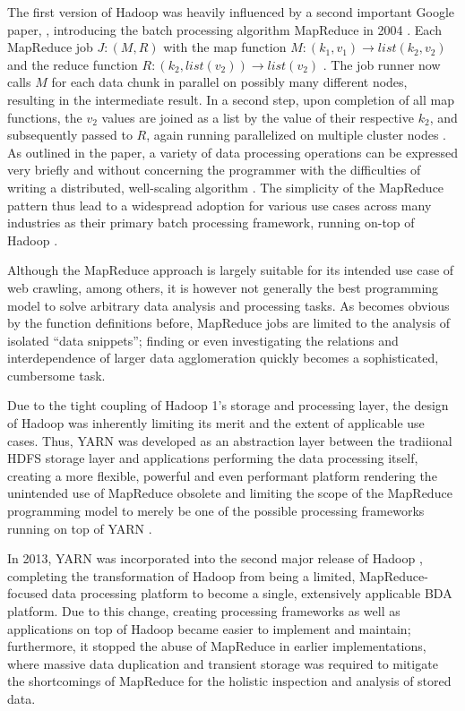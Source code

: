 The first version of Hadoop was heavily influenced by a second important Google paper, \textcite[p.~82]{rajasekar2015survey}, introducing the batch processing algorithm MapReduce in 2004 \autocite{dean2004mapreduce}. Each MapReduce job $J: (M, R)$ with the map function $M: (k_1, v_1) \rightarrow list(k_2, v_2)$ and the reduce function $R: (k_2, list(v_2)) \rightarrow list(v_2)$ \autocite[p.~6]{dean2004mapreduce}. The job runner now calls $M$ for each data chunk in parallel on possibly many different nodes, resulting in the intermediate result. In a second step, upon completion of all map functions, the $v_2$ values are joined as a list by the value of their respective $k_2$, and subsequently passed to $R$, again running parallelized on multiple cluster nodes \autocite[p.~6]{dean2004mapreduce}. As outlined in the paper, a variety of data processing operations can be expressed very briefly and without concerning the programmer with the difficulties of writing a distributed, well-scaling algorithm \autocite[p.~6]{dean2004mapreduce}. The simplicity of the MapReduce pattern thus lead to a widespread adoption for various use cases across many industries as their primary batch processing framework, running on-top of Hadoop \autocite[p.~82]{rajasekar2015survey}.

Although the MapReduce approach is largely suitable for its intended use case of web crawling, among others, it is however not generally the best programming model to solve arbitrary data analysis and processing tasks.
As becomes obvious by the function definitions before, MapReduce jobs are limited to the analysis of isolated \enquote{data snippets}; finding or even investigating the relations and interdependence of larger data agglomeration quickly becomes a sophisticated, cumbersome task.

Due to the tight coupling of Hadoop 1's storage and processing layer, the design of Hadoop was inherently limiting its merit and the extent of applicable use cases. Thus, \ac{YARN} was developed as an abstraction layer between the tradiional \ac{HDFS} storage layer and applications performing the data processing itself, creating a more flexible, powerful and even performant platform rendering the unintended use of MapReduce obsolete and limiting the scope of the MapReduce programming model to merely be one of the possible processing frameworks running on top of \ac{YARN} \autocite[p.~6]{vavilapalli2013apache}.

In 2013, \ac{YARN} was incorporated into the second major release of Hadoop \autocite{hadoopreleasenotes}, completing the transformation of Hadoop from being a limited, MapReduce-focused data processing platform to become a single, extensively applicable \ac{BDA} platform. Due to this change, creating processing frameworks as well as applications on top of Hadoop became easier to implement and maintain; furthermore, it stopped the abuse of MapReduce in earlier implementations, where massive data duplication and transient storage was required to mitigate the shortcomings of MapReduce for the holistic inspection and analysis of stored data.

